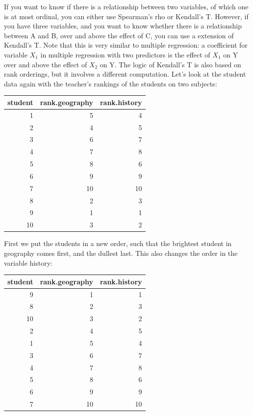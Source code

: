 \documentclass[]{report}\usepackage[]{graphicx}\usepackage[]{color}
\newenvironment{knitrout}{}{} %
\begin{document}
If you want to know if there is a relationship between two variables, of which one is at most ordinal, you can either use Spearman's rho or Kendall's T. However, if you have three variables, and you want to know whether there is a relationship between A and B, over and above the effect of C, you can use a extension of Kendall's T. Note that this is very similar to multiple regression: a coefficient for variable $X_1$ in multiple regression with two predictors is the effect of $X_1$ on Y over and above the effect of $X_2$ on Y. The logic of Kendall's T is also based on rank orderings, but it involves a different computation. Let's look at the student data again with the teacher's rankings of the students on two subjects:

\begin{knitrout}
\color{fgcolor}
\begin{tabular}{r|r|r}
\hline
student & rank.geography & rank.history\\
\hline
1 & 5 & 4\\
\hline
2 & 4 & 5\\
\hline
3 & 6 & 7\\
\hline
4 & 7 & 8\\
\hline
5 & 8 & 6\\
\hline
6 & 9 & 9\\
\hline
7 & 10 & 10\\
\hline
8 & 2 & 3\\
\hline
9 & 1 & 1\\
\hline
10 & 3 & 2\\
\hline
\end{tabular}


\end{knitrout}


First we put the students in a new order, such that the brightest student in geography comes first, and the dullest last. This also changes the order in the variable history:
\begin{knitrout}
\color{fgcolor}
\begin{tabular}{r|r|r}
\hline
student & rank.geography & rank.history\\
\hline
9 & 1 & 1\\
\hline
8 & 2 & 3\\
\hline
10 & 3 & 2\\
\hline
2 & 4 & 5\\
\hline
1 & 5 & 4\\
\hline
3 & 6 & 7\\
\hline
4 & 7 & 8\\
\hline
5 & 8 & 6\\
\hline
6 & 9 & 9\\
\hline
7 & 10 & 10\\
\hline
\end{tabular}


\end{knitrout}
\end{document}
